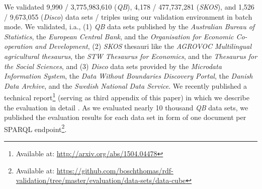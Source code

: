 \documentclass{llncs}
\begin{document}
We validated 
9,990 / 3,775,983,610 (\emph{QB}),
4,178 / 477,737,281 (\emph{SKOS}), and 
1,526 / 9,673,055 (\emph{Disco}) data sets / triples using our validation environment in batch mode.
We validated, i.a., 
(1) \emph{QB} data sets published by the \emph{Australian Bureau of Statistics},
the \emph{European Central Bank}, and the
\emph{Organisation for Economic Co-operation and Development},
(2) \emph{SKOS} thesauri like the \emph{AGROVOC Multilingual agricultural thesaurus},
the \emph{STW Thesaurus for Economics}, and the
\emph{Thesaurus for the Social Sciences}, and
(3) \emph{Disco} data sets provided by the \emph{Microdata Information System}, 
the \emph{Data Without Boundaries Discovery Portal}, the
\emph{Danish Data Archive}, and the
\emph{Swedish National Data Service}.
We recently published a technical report\footnote{\label{technical-report-2}Available at: \url{http://arxiv.org/abs/1504.04478}} (serving as third appendix of this paper) 
in which we describe the evaluation in detail \cite{BoschZapilkoWackerowEckert2015-2}. 
As we evaluated nearly 10 thousand \emph{QB} data sets, we published the evaluation results for each data set in form of one document per SPARQL endpoint\footnote{Available at: \url{https://github.com/boschthomas/rdf-validation/tree/master/evaluation/data-sets/data-cube}}.
\end{document}
